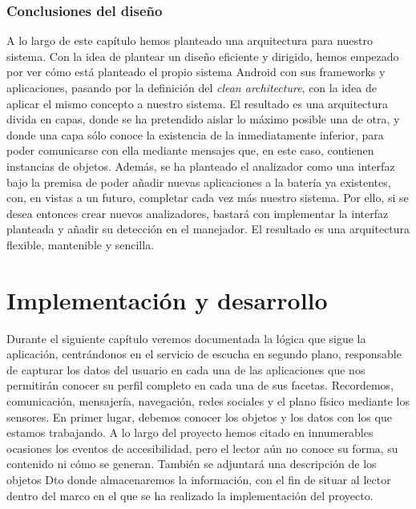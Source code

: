 \documentclass[12pt,a4paper,oneside]{book} %
\begin{document}
\subsection{Conclusiones del diseño}
A lo largo de este capítulo hemos planteado una arquitectura para nuestro sistema. Con la idea de plantear un diseño eficiente y dirigido, hemos empezado por ver cómo está planteado el propio sistema Android con sus frameworks y aplicaciones, pasando por la definición del \textit{clean architecture}, con la idea de aplicar el mismo concepto a nuestro sistema. 
\newline \newline 
El resultado es una arquitectura divida en capas, donde se ha pretendido aislar lo máximo posible una de otra, y donde una capa sólo conoce la existencia de la inmediatamente inferior, para poder comunicarse con ella mediante mensajes que, en este caso, contienen instancias de objetos. 
\newline \newline 
Además, se ha planteado el analizador como una interfaz bajo la premisa de poder añadir nuevas aplicaciones a la batería ya existentes, con, en vistas a un futuro, completar cada vez más nuestro sistema. Por ello, si se desea entonces crear nuevos analizadores, bastará con implementar la interfaz planteada y añadir su detección en el manejador. 
\newline \newline 
El resultado es una arquitectura flexible, mantenible y sencilla. 
\chapter{Implementación y desarrollo}
Durante el siguiente capítulo veremos documentada la lógica que sigue la aplicación, centrándonos en el servicio de escucha en segundo plano, responsable de capturar los datos del usuario en cada una de las aplicaciones que nos permitirán conocer su perfil completo en cada una de sus facetas. Recordemos, comunicación, mensajería, navegación, redes sociales y el plano físico mediante los sensores. 
\newline \newline 
En primer lugar, debemos conocer los objetos y los datos con los que estamos trabajando. A lo largo del proyecto hemos citado en innumerables ocasiones los eventos de accesibilidad, pero el lector aún no conoce su forma, su contenido ni cómo se generan. También se adjuntará una descripción de los objetos Dto donde almacenaremos la información, con el fin de situar al lector dentro del marco en el que se ha realizado la implementación del proyecto. 
\end{document}
